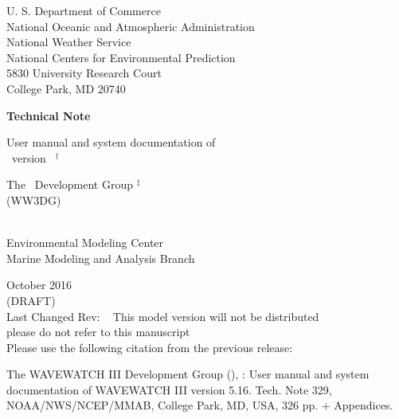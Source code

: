 
\pagestyle{empty}

\begin{center} 
U. S. Department of Commerce \\
National Oceanic and Atmospheric Administration \\
National Weather Service \\
National Centers for Environmental Prediction \\
5830 University Research Court \\
College Park, MD 20740


\vspace{15mm}

{\bf Technical Note}

\vspace{15mm}

{\large User manual and system documentation of \\
\ww\ version \WWver\ $^\dag$} \\

\vspace{15mm}

The \ww\ Development Group $^\ddag$ \\
(WW3DG)\\
\strut \\
Environmental Modeling Center \\
Marine Modeling and Analysis Branch

\vfill

 October 2016 \\
(DRAFT) \\
Last Changed Rev: \SVNRevision\ %
\vspace{\baselineskip}
This model version will not be distributed \\
{\sc please do not refer to this manuscript} \\
Please use the following citation from the previous release: 
\end{center}
\noindent The WAVEWATCH III\textsuperscript{\textregistered} Development Group (), \citeyearpar{ww3man2016}: User manual and system documentation of  WAVEWATCH III\textsuperscript{\textregistered} version 5.16. Tech. Note 329, NOAA/NWS/NCEP/MMAB, College Park, MD, USA, 326 pp. + Appendices. 

